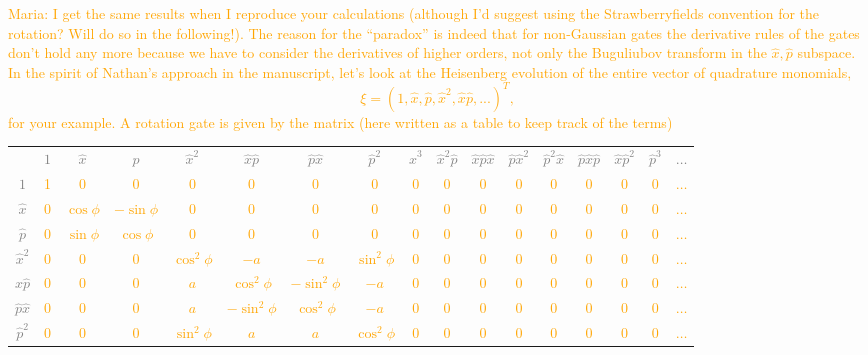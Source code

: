 \documentclass[aps,pra,10pt,onecolumn,notitlepage, groupedaddress,nofootinbib]{revtex4-1}
\theoremstyle{plain}
\newcommand{\x}{\hat{x}}
\newcommand{\p}{\hat{p}}
\newcommand{\maria}[1]{\textcolor{orange}{Maria: #1}}
\begin{document}
\maria{I get the same results when I reproduce your calculations (although I'd suggest using the Strawberryfields convention for the rotation? Will do so in the following!). The reason for the ``paradox'' is indeed that for non-Gaussian gates the derivative rules of the gates don't hold any more because we have to consider the derivatives of higher orders, not only the Buguliubov transform in the $\x, \p$ subspace.
In the spirit of Nathan's approach in the manuscript, let's look at the Heisenberg evolution of the entire vector of quadrature monomials,
\[ \xi = (1, \x, \p , \x^2, \x \p,...)^T,\]
for your example. A rotation gate is given by the matrix (here written as a table to keep track of the terms)\\
\begin{center}
\def\arraystretch{1.5}
\footnotesize
\begin{tabular}{ccccccccccccccccc}
& \textcolor{gray}{$1$} & \textcolor{gray}{$\hat{x}$} & \textcolor{gray}{$\hat{p}$} & \textcolor{gray}{$\hat{x}^2$} & \textcolor{gray}{$\hat{x}\hat{p}$} & \textcolor{gray}{$\hat{p}\hat{x}$} & \textcolor{gray}{$\hat{p}^2$} & \textcolor{gray}{$\hat{x}^3$} & \textcolor{gray}{$\hat{x}^2\hat{p}$} & \textcolor{gray}{$\hat{x}\hat{p}\hat{x}$} & \textcolor{gray}{$\hat{p}\hat{x}^2$} &  \textcolor{gray}{$\hat{p}^2\hat{x}$} &  \textcolor{gray}{$\hat{p}\hat{x}\hat{p}$} &  \textcolor{gray}{$\hat{x}\hat{p}^2$} & \textcolor{gray}{$\hat{p}^3$} & \textcolor{gray}{$\hdots$} \\  
\textcolor{gray}{$1$} & 1 & 0 & 0 & 0 & 0 & 0 & 0 & 0 & 0 & 0 & 0 & 0 & 0 & 0 & 0 &  $\hdots$\\ 
\textcolor{gray}{$\hat{x}$} & 0 & $\cos \phi$ & $-\sin \phi$ & 0 & 0 & 0 & 0 & 0 & 0 & 0 & 0 & 0 & 0 & 0  & 0 & $\hdots$\\ 
\textcolor{gray}{$\hat{p}$} & 0 & $\sin \phi$ & $ \cos \phi$ & 0 & 0 & 0 & 0 & 0 & 0  & 0 & 0 & 0 & 0 & 0 & 0 & $\hdots$\\ 
\textcolor{gray}{$\hat{x}^2$} & 0 & 0 & 0 & $\cos^2 \phi$ & $- a$ & $- a$  & $\sin^2 \phi$ &  0 & 0 & 0 & 0 & 0 & 0 & 0 & 0 & $\hdots$\\ 
\textcolor{gray}{$\hat{x}\hat{p}$} & 0 & 0 & 0 & $ a$ & $\cos^2 \phi$ & $-\sin^2 \phi$  & $-a$  & 0 & 0 & 0 & 0 & 0 & 0& 0 & 0 & $\hdots$\\ 
\textcolor{gray}{$\hat{p}\hat{x}$} & 0 & 0 & 0 & $a$ & $-\sin^2 \phi$  & $\cos^2 \phi$ & $-a$ &  0 & 0 & 0 & 0 & 0 & 0& 0 & 0 & $\hdots$\\ 
\textcolor{gray}{$\hat{p}^2$} & 0 & 0 & 0 & $\sin^2 \phi$ & $a$ & $a$  & $\cos^2 \phi$ & 0 & 0 & 0 & 0& 0 & 0 & 0 & 0 & $\hdots$\\ 

\end{tabular}
\end{center}}
\end{document}
